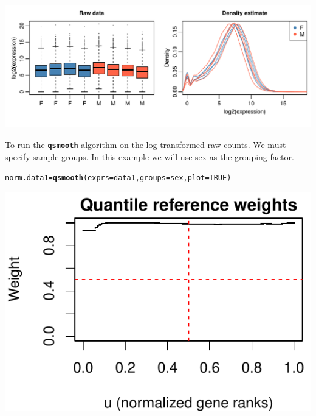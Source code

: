 \documentclass{article}\usepackage[]{graphicx}\usepackage[usenames,dvipsnames]{color}
\makeatletter
\def\maxwidth{ %
  \ifdim\Gin@nat@width>\linewidth
    \linewidth
  \else
    \Gin@nat@width
  \fi
}
\newcommand{\hlnum}[1]{\textcolor[rgb]{0.686,0.059,0.569}{#1}}%
\newcommand{\hlstd}[1]{\textcolor[rgb]{0.345,0.345,0.345}{#1}}%
\newcommand{\hlkwb}[1]{\textcolor[rgb]{0.69,0.353,0.396}{#1}}%
\newcommand{\hlkwc}[1]{\textcolor[rgb]{0.333,0.667,0.333}{#1}}%
\newcommand{\hlkwd}[1]{\textcolor[rgb]{0.737,0.353,0.396}{\textbf{#1}}}%
\newenvironment{kframe}{%
 \def\at@end@of@kframe{}%
 \ifinner\ifhmode%
  \def\at@end@of@kframe{\end{minipage}}%
  \begin{minipage}{\columnwidth}%
 \fi\fi%
 \def\FrameCommand##1{\hskip\@totalleftmargin \hskip-\fboxsep
 \colorbox{shadecolor}{##1}\hskip-\fboxsep
     \hskip-\linewidth \hskip-\@totalleftmargin \hskip\columnwidth}%
 \MakeFramed {\advance\hsize-\width
   \@totalleftmargin\z@ \linewidth\hsize
   \@setminipage}}%
 {\par\unskip\endMakeFramed%
 \at@end@of@kframe}
\newenvironment{knitrout}{}{} %
\makeatother
\begin{document}
\begin{knitrout}
\color{fgcolor}

{\centering \includegraphics[width=\maxwidth]{figure/raw1-1} 

}



\end{knitrout}

To run the \texttt{\bf{qsmooth}} algorithm on the log transformed raw counts.
We must specify sample groups. 
In this example we will use sex as the grouping factor.

\begin{knitrout}
\color{fgcolor}\begin{kframe}
\begin{alltt}
\hlstd{norm.data1} \hlkwb{=} \hlkwd{qsmooth}\hlstd{(}\hlkwc{exprs}\hlstd{=data1,} \hlkwc{groups}\hlstd{=sex,} \hlkwc{plot}\hlstd{=}\hlnum{TRUE}\hlstd{)}
\end{alltt}
\end{kframe}

{\centering \includegraphics[width=\maxwidth]{figure/qsmooth1-1} 

}



\end{knitrout}
\end{document}
